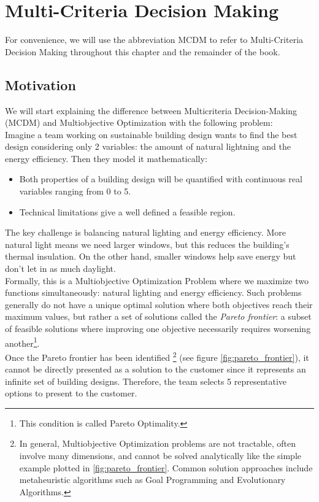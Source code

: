 \chapter{Multi-Criteria Decision Making}

For convenience, we will use the abbreviation MCDM to refer to Multi-Criteria Decision Making throughout this chapter and the remainder of the book.



\section*{Motivation}
We will start explaining the difference between Multicriteria Decision-Making (MCDM) and Multiobjective Optimization with the following problem:\\

Imagine a team working on \textnormal{sustainable building design} wants to find the best design considering only 2 variables: the amount of natural lightning and the energy efficiency. Then they model it mathematically:\vspace{-0.7em}
\begin{itemize}
    \item Both properties of a building design will be quantified with continuous real variables ranging from 0 to 5.\vspace{-0.8em}
    \item Technical limitations give a well defined a feasible region.\vspace{-0.7em}
\end{itemize}
The key challenge is balancing natural lighting and energy efficiency. More natural light means we need larger windows, but this reduces the building's thermal insulation. On the other hand, smaller windows help save energy but don't let in as much daylight.\\

Formally, this is a Multiobjective Optimization Problem where we maximize two functions simultaneously: natural lighting and energy efficiency. Such problems generally do not have a unique optimal solution where both objectives reach their maximum values, but rather a set of solutions called the \textit{Pareto frontier}: a subset of feasible solutions where improving one objective necessarily requires worsening another\footnote{This condition is called Pareto Optimality.}.\\

Once the Pareto frontier has been identified
\footnote{In general, Multiobjective Optimization problems are not tractable, often involve many dimensions, and cannot be solved analytically like the simple example plotted in \ref{fig:pareto_frontier}. Common solution approaches include metaheuristic algorithms such as Goal Programming and Evolutionary Algorithms.}
(see figure \ref{fig:pareto_frontier}), it cannot be directly presented as a solution to the customer since it represents an infinite set of building designs. Therefore, the team selects 5 representative options to present to the customer. \\

